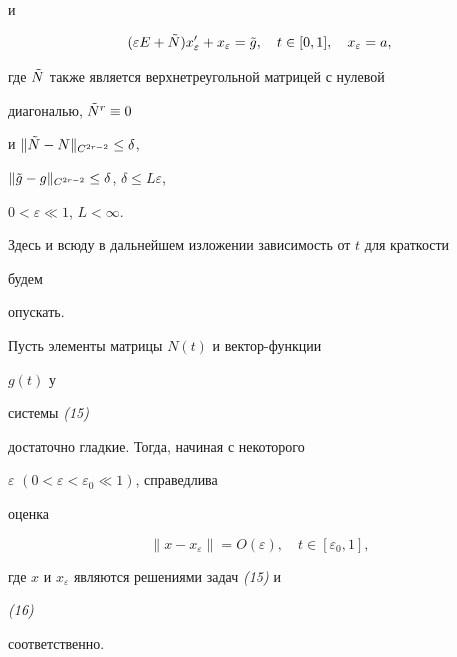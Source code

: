 и


\begin{equation}


(\varepsilon E+\Tilde N)x'_\varepsilon+x_\varepsilon=\Tilde g,


\quad t\in[0,1],\quad x_\varepsilon=a,


\end{equation}


где $\Tilde N$ также является верхнетреугольной матрицей с нулевой


диагональю, $\Tilde N^r\equiv 0$


и $\|\Tilde N-N\|_{C^{2r-2}}\le\delta$,


$\|\Tilde g-g\|_{C^{2r-2}}\le\delta$, $\delta\le L\varepsilon$,


$0<\varepsilon\ll 1$, $L<\infty$.





Здесь и всюду в дальнейшем изложении зависимость от $t$ для краткости


будем


опускать.





\begin{lemnonum} Пусть элементы матрицы $N(t)$ и вектор-функции


$g(t)$ у


системы {\em (15)}


достаточно гладкие. Тогда, начиная с некоторого


$\varepsilon$ $(0<\varepsilon<\varepsilon_0\ll 1)$, справедлива


оценка


$$


\|x-x_\varepsilon\|=O(\varepsilon),\quad t\in[\varepsilon_0,1],


$$


где $x$ и $x_\varepsilon$ являются решениями задач {\em (15)} и


{\em (16)}


соответственно.


\end{lemnonum}





